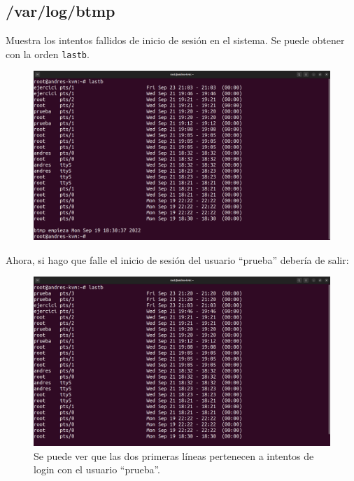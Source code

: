 \documentclass{article}
\begin{document}
\subsection*{/var/log/btmp}
Muestra los intentos fallidos de inicio de sesión en el sistema. Se puede obtener con la orden \verb|lastb|.

\begin{figure}[H]
    \includegraphics[width=\textwidth]{imagenes/lastbnormal.png}
\end{figure}

\bigskip

Ahora, si hago que falle el inicio de sesión del usuario ``prueba'' debería de salir:

\begin{figure}[H]
    \includegraphics[width=\textwidth]{imagenes/lastbpruebafirst.png}
    \caption{Se puede ver que las dos primeras líneas pertenecen a intentos de login con el usuario ``prueba''.}
\end{figure}

\end{document}
